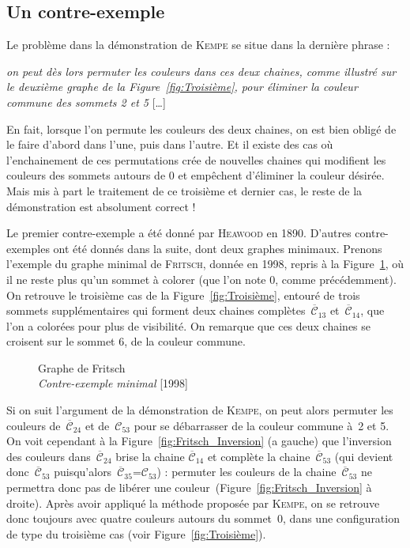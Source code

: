\documentclass[french]{report}
\begin{document}
\subsection{Un contre-exemple}

Le problème dans la démonstration de \textsc{Kempe} se situe dans la dernière phrase :
\begin{changemargin}{.4cm}{.4cm}
	[…] \textit{on peut dès lors permuter les couleurs dans ces deux chaines, comme illustré sur le deuxième graphe de la Figure~\ref{fig:Troisième}, pour éliminer la couleur commune des sommets 2 et 5} […]
\end{changemargin}
En fait, lorsque l'on permute les couleurs des deux chaines, on est bien obligé de le faire d'abord dans l'une, puis dans l'autre. Et il existe des cas où l'enchainement de ces permutations crée de nouvelles chaines qui modifient les couleurs des sommets autours de 0 et empêchent d'éliminer la couleur désirée. Mais mis à part le traitement de ce troisième et dernier cas, le reste de la démonstration est absolument correct !

Le premier contre-exemple a été donné par \textsc{Heawood} en 1890. D'autres contre-exemples ont été donnés dans la suite, dont deux graphes minimaux.  Prenons l'exemple du graphe minimal de \textsc{Fritsch}, donnée en 1998, repris à la Figure~\ref{fig:Fritsch}, où il ne reste plus qu'un sommet à colorer (que l'on note 0, comme précédemment).  On retrouve le troisième cas de la Figure~\ref{fig:Troisième}, entouré de trois sommets supplémentaires qui forment deux chaines complètes~$\overline{\mathcal{C}}_{13}$ et~$\overline{\mathcal{C}}_{14}$, que l'on a colorées pour plus de visibilité. On remarque que ces deux chaines se croisent sur le sommet 6, de la couleur commune.

\begin{figure}
	
	\caption{Graphe de Fritsch\\\footnotesize\textit{Contre-exemple minimal} [1998]}\label{fig:Fritsch}
\end{figure}
\FloatBarrier

Si on suit l'argument de la démonstration de \textsc{Kempe}, on peut alors permuter les couleurs de~$\overline{\mathcal{C}}_{24}$ et de~$\mathcal{C}_{53}$ pour se débarrasser de la couleur commune à~2 et 5. On voit cependant à la Figure~\ref{fig:Fritsch_Inversion} (a gauche) que l'inversion des couleurs dans~$\overline{\mathcal{C}}_{24}$ brise la chaine 
$\overline{\mathcal{C}}_{14}$ et complète la chaine~$\overline{\mathcal{C}}_{53}$ (qui devient donc~$\overline{\mathcal{C}}_{53}$ puisqu'alors~$\overline{\mathcal{C}}_{35}$=$\mathcal{C}_{53}$) : permuter les couleurs de la chaine~$\overline{\mathcal{C}}_{53}$ ne permettra donc pas de libérer une couleur~(Figure~\ref{fig:Fritsch_Inversion} à droite). Après avoir appliqué la méthode proposée par \textsc{Kempe}, on se retrouve donc toujours avec quatre couleurs autours du sommet~0, dans une configuration de type du troisième cas (voir Figure~\ref{fig:Troisième}).
\end{document}
